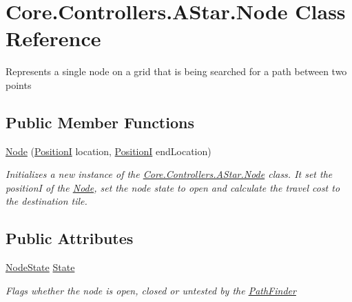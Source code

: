 \hypertarget{classCore_1_1Controllers_1_1AStar_1_1Node}{}\section{Core.\+Controllers.\+A\+Star.\+Node Class Reference}
\label{classCore_1_1Controllers_1_1AStar_1_1Node}


Represents a single node on a grid that is being searched for a path between two points  


\subsection*{Public Member Functions}
\begin{DoxyCompactItemize}
\item 
\hyperlink{classCore_1_1Controllers_1_1AStar_1_1Node_aeb30baa8c27247c0db4353875388d140}{Node} (\hyperlink{classCore_1_1Models_1_1PositionI}{Position\+I} location, \hyperlink{classCore_1_1Models_1_1PositionI}{Position\+I} end\+Location)
\begin{DoxyCompactList}\small\item\em Initializes a new instance of the \hyperlink{classCore_1_1Controllers_1_1AStar_1_1Node}{Core.\+Controllers.\+A\+Star.\+Node} class. It set the position\+I of the \hyperlink{classCore_1_1Controllers_1_1AStar_1_1Node}{Node}, set the node state to open and calculate the travel cost to the destination tile. \end{DoxyCompactList}\end{DoxyCompactItemize}
\subsection*{Public Attributes}
\begin{DoxyCompactItemize}
\item 
\hyperlink{namespaceCore_1_1Controllers_1_1AStar_a35790b9ccd2b721f3e90cb49769caab9}{Node\+State} \hyperlink{classCore_1_1Controllers_1_1AStar_1_1Node_ab00b1c1216243bb73857cbee2831f662}{State}
\begin{DoxyCompactList}\small\item\em Flags whether the node is open, closed or untested by the \hyperlink{classCore_1_1Controllers_1_1AStar_1_1PathFinder}{Path\+Finder} \end{DoxyCompactList}\end{DoxyCompactItemize}
